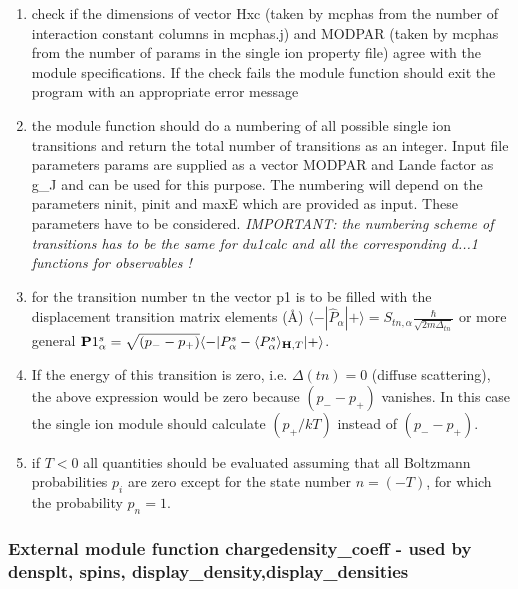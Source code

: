 \begin{enumerate}
\item check if the dimensions of vector Hxc (taken by {\prg mcphas} from the number of 
interaction constant columns in {\prg mcphas.j})
 and MODPAR (taken by {\prg mcphas} from the number of params in the single ion property
file) agree with the module specifications. If the check fails the module function should exit the
program with an appropriate error message
\item the module function should do a numbering of all possible single ion transitions and return
the total number of transitions as an integer. Input file parameters params are supplied as a vector MODPAR and
Lande factor as g\_J and  can be used for this purpose. The numbering will depend on
the parameters ninit, pinit and maxE which are provided as input. These parameters
have to be considered. {\em IMPORTANT: the numbering scheme of transitions has to
be the same for du1calc and all the corresponding d...1 functions for observables !}
\item for the transition number tn the vector p1 is to
 be filled with the displacement transition matrix elements (\AA)
$\langle-|\hat P_{\alpha}|+\rangle=S_{tn,\alpha}\frac{\hbar}{\sqrt{2m\Delta_{tn}}}$
or more general
${\mathbf P1^s_{\alpha}}=\sqrt{(p_--p_+)}\langle -|P^s_{\alpha}-\langle P^s_{\alpha}\rangle_{\mathbf H,T}|+\rangle$.
\item
If the energy of this transition
is zero, i.e. $\Delta(tn)=0$ (diffuse scattering), 
the above expression  would be zero because $(p_--p_+)$ vanishes.
In this case the single ion module should calculate $(p_+/kT)$ instead of $(p_--p_+)$.
\item if $T<0$ all quantities should be evaluated assuming that all Boltzmann probabilities $p_i$
 are zero except for the state number $n=(-T)$, for which the probability $p_n=1$.
\end{enumerate}
 


\subsubsection{External module function {\prg chargedensity\_coeff} -
used by {\prg densplt},
{\prg spins},
{\prg display\_density},{\prg display\_densities}}

